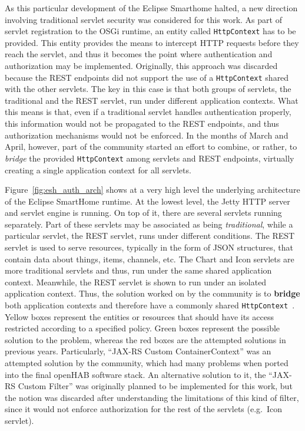 \documentclass[12pt]{article}
\begin{document}
As this particular development of the Eclipse Smarthome halted, a new direction involving traditional servlet security was considered for this work. As part of servlet registration to the OSGi runtime, an entity called \texttt{HttpContext} has to be provided. This entity provides the means to intercept HTTP requests before they reach the servlet, and thus it becomes the point where authentication and authorization may be implemented. Originally, this approach was discarded because the REST endpoints did not support the use of a \texttt{HttpContext} shared with the other servlets. The key in this case is that both groups of servlets, the traditional and the REST servlet, run under different application contexts. What this means is that, even if a traditional servlet handles authentication properly, this information would not be propagated to the REST endpoints, and thus authorization mechanisms would not be enforced. In the months of March and April, however, part of the community started an effort to combine, or rather, to \emph{bridge} the provided \texttt{HttpContext} among servlets and REST endpoints, virtually creating a single application context for all servlets.

Figure~\ref{fig:esh_auth_arch} shows at a very high level the underlying architecture of the Eclipse SmartHome runtime. At the lowest level, the Jetty HTTP server and servlet engine is running. On top of it, there are several servlets running separately. Part of these servlets may be associated as being \emph{traditional}, while a particular servlet, the REST servlet, runs under different conditions. The REST servlet is used to serve resources, typically in the form of JSON structures, that contain data about things, items, channels, etc. The Chart and Icon servlets are more traditional servlets and thus, run under the same shared application context. Meanwhile, the REST servlet is shown to run under an isolated application context. Thus, the solution worked on by the community is to \textbf{bridge} both application contexts and therefore have a commonly shared \texttt{HttpContext}~\cite{esh_03}. Yellow boxes represent the entities or resources that should have its access restricted according to a specified policy. Green boxes represent the possible solution to the problem, whereas the red boxes are the attempted solutions in previous years. Particularly, ``JAX-RS Custom ContainerContext'' was an attempted solution by the community, which had many problems when ported into the final openHAB software stack. An alternative solution to it, the ``JAX-RS Custom Filter'' was originally planned to be implemented for this work, but the notion was discarded after understanding the limitations of this kind of filter, since it would not enforce authorization for the rest of the servlets (e.g.\ Icon servlet). 
\end{document}
